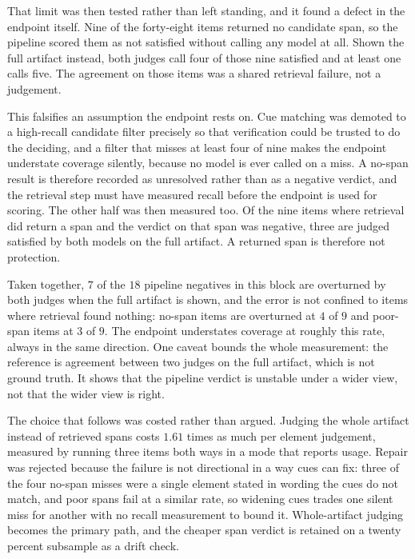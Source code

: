 \documentclass[11pt,a4paper]{article}
\begin{document}
That limit was then tested rather than left standing, and it found a defect in the
endpoint itself. Nine of the forty-eight items returned no candidate span, so the pipeline
scored them as not satisfied without calling any model at all. Shown the full artifact
instead, both judges call four of those nine satisfied and at least one calls five. The
agreement on those items was a shared retrieval failure, not a judgement.

This falsifies an assumption the endpoint rests on. Cue matching was demoted to a
high-recall candidate filter precisely so that verification could be trusted to do the
deciding, and a filter that misses at least four of nine makes the endpoint understate
coverage silently, because no model is ever called on a miss. A no-span result is
therefore recorded as unresolved rather than as a negative verdict, and the retrieval step
must have measured recall before the endpoint is used for scoring. The other half was then measured too. Of the nine
items where retrieval did return a span and the verdict on that span was negative, three
are judged satisfied by both models on the full artifact. A returned span is therefore not
protection.

Taken together, $7$ of the $18$ pipeline negatives in this block are overturned by both
judges when the full artifact is shown, and the error is not confined to items where
retrieval found nothing: no-span items are overturned at $4$ of $9$ and poor-span items at
$3$ of $9$. The endpoint understates coverage at roughly this rate, always in the same
direction. One caveat bounds the whole measurement: the reference is agreement between two
judges on the full artifact, which is not ground truth. It shows that the pipeline verdict
is unstable under a wider view, not that the wider view is right.

The choice that follows was costed rather than argued. Judging the whole artifact instead
of retrieved spans costs $1.61$ times as much per element judgement, measured by running
three items both ways in a mode that reports usage. Repair was rejected because the
failure is not directional in a way cues can fix: three of the four no-span misses were a
single element stated in wording the cues do not match, and poor spans fail at a similar
rate, so widening cues trades one silent miss for another with no recall measurement to
bound it. Whole-artifact judging becomes the primary path, and the cheaper span verdict is
retained on a twenty percent subsample as a drift check.
\end{document}
